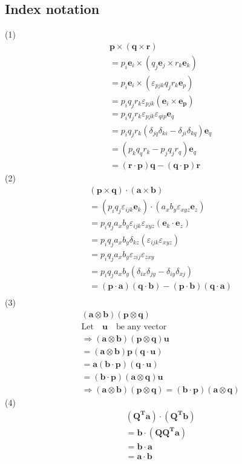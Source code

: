 \documentclass{elsarticle}
\begin{document}
\subsection{Index notation}
(1)
\begin{align*}
&\bm{p}\times(\bm{q}\times\bm{r})\\
&=p_i\bm{e}_i\times(q_j\bm{e}_j\times r_k\bm{e}_k)\\
&=p_i\bm{e}_i\times(\varepsilon_{pjk}q_jr_k\bm{e}_p)\\
&=p_iq_jr_k\varepsilon_{pjk}(\bm{e}_i\times\bm{e_p})\\
&=p_iq_jr_k\varepsilon_{pjk}\varepsilon_{qip}\bm{e}_q\\
&=p_iq_jr_k(\delta_{jq}\delta_{ki}-\delta_{ji}\delta_{kq})\bm{e}_q\\
&=(p_kq_qr_k-p_jq_jr_q)\bm{e}_q\\
&=(\bm{r}\cdot\bm{p})\bm{q}-(\bm{q}\cdot\bm{p})\bm{r}
\end{align*}
(2)
\begin{align*}
&(\bm{p}\times\bm{q})\cdot(\bm{a}\times\bm{b})\\
&=(p_iq_j\varepsilon_{ijk}\bm{e}_k)\cdot(a_xb_y\varepsilon_{xyz}\bm{e}_z)\\
&=p_iq_ja_xb_y\varepsilon_{ijk}\varepsilon_{xyz}(\bm{e}_k\cdot\bm{e}_z)\\
&=p_iq_ja_xb_y\delta_{kz}(\varepsilon_{ijk}\varepsilon_{xyz})\\
&=p_iq_ja_xb_y\varepsilon_{zij}\varepsilon_{zxy}\\
&=p_iq_ja_xb_y(\delta_{ix}\delta_{jy}-\delta_{iy}\delta_{xj})\\
&=(\bm{p}\cdot\bm{a})(\bm{q}\cdot\bm{b})-(\bm{p}\cdot\bm{b})(\bm{q}\cdot\bm{a})\\
\end{align*}
(3)
\begin{align*}
    &(\bm{a}\otimes\bm{b})(\bm{p}\otimes\bm{q})\\
    &\text{Let} \quad\bm{u}\quad \text{be any vector}\\
    &\Rightarrow (\bm{a}\otimes\bm{b})(\bm{p}\otimes\bm{q})\bm{u}\\
    &=(\bm{a}\otimes\bm{b})\bm{p}(\bm{q}\cdot\bm{u})\\
    &=\bm{a}(\bm{b}\cdot\bm{p})({\bm{q}\cdot\bm{u}})\\
    &=(\bm{b}\cdot\bm{p})(\bm{a}\otimes\bm{q})\bm{u}\\
    &\Rightarrow(\bm{a}\otimes\bm{b})(\bm{p}\otimes\bm{q}) = (\bm{b}\cdot\bm{p})(\bm{a}\otimes\bm{q})
\end{align*}
(4)
\begin{align*}
&(\mathbf{Q^T}\bm{a})\cdot(\mathbf{Q^T}\bm{b})\\
&=\bm{b}\cdot(\mathbf{Q}\mathbf{Q^T}\bm{a})\\
&=\bm{b}\cdot\bm{a}\\
&=\bm{a}\cdot\bm{b}
\end{align*}
\end{document}
